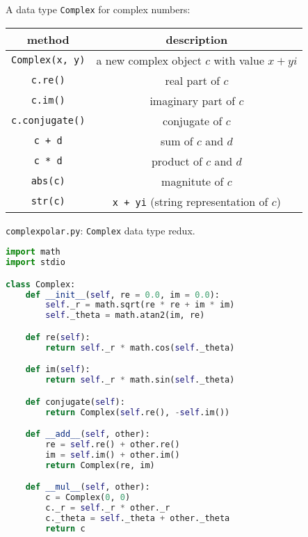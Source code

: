 \documentclass[8pt,a4paper,compress,handout]{beamer}
\begin{document}
\begin{frame}[fragile]
A data type \lstinline{Complex} for complex numbers:
\begin{center}
\begin{tabular}{cc}
method & description \\ \hline
\lstinline$Complex(x, y)$ & a new complex object $c$ with value $x + yi$ \\
\lstinline$c.re()$ & real part of $c$ \\
\lstinline$c.im()$ & imaginary part of $c$ \\
\lstinline$c.conjugate()$ & conjugate of $c$ \\
\lstinline$c + d$ & sum of $c$ and $d$ \\
\lstinline$c * d$ & product of $c$ and $d$ \\
\lstinline$abs(c)$ & magnitute of $c$ \\
\lstinline$str(c)$ & \lstinline$x + yi$ (string representation of $c$)
\end{tabular} 
\end{center}
\end{frame}

\begin{frame}[fragile]
\begin{framed}
\tiny \lstinline{complexpolar.py}: \lstinline{Complex} data type redux. 
\end{framed}

\begin{lstlisting}[language=Python]
import math
import stdio

class Complex:
    def __init__(self, re = 0.0, im = 0.0):
        self._r = math.sqrt(re * re + im * im)
        self._theta = math.atan2(im, re)

    def re(self):
        return self._r * math.cos(self._theta)

    def im(self):
        return self._r * math.sin(self._theta)

    def conjugate(self):
        return Complex(self.re(), -self.im())

    def __add__(self, other):
        re = self.re() + other.re()
        im = self.im() + other.im()
        return Complex(re, im)

    def __mul__(self, other):
        c = Complex(0, 0)
        c._r = self._r * other._r
        c._theta = self._theta + other._theta
        return c
\end{lstlisting}
\end{frame}
\end{document}
